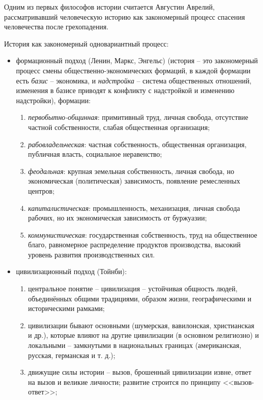 
Одним из первых философов истории считается Августин Аврелий, рассматривавший человеческую историю как закономерный процесс спасения человечества после грехопадения.

История как закономерный одновариантный процесс:
\begin{itemize}
	\item формационный подход (Ленин, Маркс, Энгельс) (история -- это закономерный процесс смены общественно-экономических формаций, в каждой формации есть \textit{базис} -- экономика, и \textit{надстройка} -- система общественных отношений, изменения в базисе приводят к конфликту с надстройкой и изменению надстройки), формации:
	\begin{enumerate}
		\item \textit{первобытно-общинная}: примитивный труд, личная свобода, отсутствие частной собственности, слабая общественная организация;
		\item \textit{рабовладельческая}: частная собственность, общественная организация, публичная власть, социальное неравенство;
		\item \textit{феодальная}: крупная земельная собственность, личная свобода, но экономическая (политическая) зависимость, появление ремесленных центров;
		\item \textit{капиталистическая}: промышленность, механизация, личная свобода рабочих, но их экономическая зависимость от буржуазии;
		\item \textit{коммунистическая}: государственная собственность, труд на общественное благо, равномерное распределение продуктов производства, высокий уровень развития производственных сил.
	\end{enumerate}
	\item цивилизационный подход (Тойнби):
	\begin{enumerate}
		\item центральное понятие -- цивилизация -- устойчивая общность людей, объединённых общими традициями, образом жизни, географическими и историческими рамками; 
		\item цивилизации бывают основными (шумерская, вавилонская, христианская и др.), которые влияют на другие цивилизации (в основном религиозно) и локальными -- замкнутыми в национальных границах (американская, русская, германская и т. д.);
		\item движущие силы истории -- вызов, брошенный цивилизации извне, ответ на вызов и великие личности; развитие строится по принципу <<вызов-ответ>>;

\end{enumerate}
\end{itemize}
